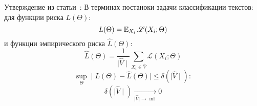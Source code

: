 \newpage


\begin{lemma}
\label{statement:1}
Утверждение из статьи~\cite{donini2018empirical}:
В терминах постаноки задачи классификации текстов:
для функции риска $L(\Theta)$:
\begin{equation}
\label{eq:2.3}
L(\Theta) = \operatorname{\mathbb{E}} _{X_i} \mathscr{L}(X_i; \Theta)
\end{equation}
и функции эмпирического риска $\hat{L}(\Theta)$:
\begin{equation}
\hat{L}(\Theta) = \frac{1}{\mid \hat{V} \mid} \sum_{X_i \in \hat{V}} \mathscr{L}(X_i; \Theta) 
\end{equation}
\begin{equation}
\sup _{\Theta} \mid L(\Theta) - \hat{L}(\Theta) \mid \le \delta(\mid \hat{V} \mid):
\end{equation}
\begin{equation}
\delta(\mid \hat{V} \mid) \xrightarrow[\mid \hat{V} \mid \rightarrow \inf]{} 0
\end{equation}
\end{lemma}
